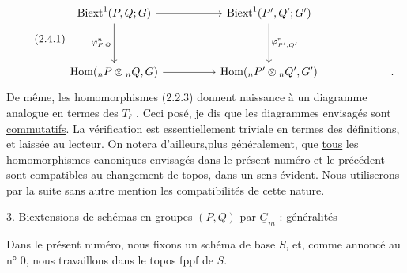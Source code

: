 \begin{equation}\tag{2.4.1}
\begin{tikzcd}[column sep=huge, row sep=huge]
\mathrm{Biext}^1(P,Q;G) \arrow[r] \arrow[d, "{\varphi^n_{P,Q}}"'] & \mathrm{Biext}^1(P',Q';G') \arrow[d, "{\varphi^n_{P',Q'}}"] & \\
\mathrm{Hom}({}_nP \otimes {}_nQ,G) \arrow[r] & \mathrm{Hom}({}_nP' \otimes {}_nQ',G') & \quad .
\end{tikzcd}
\end{equation}
De même, les homomorphismes (2.2.3) donnent naissance à un diagramme analogue en termes des $T_\ell$ . Ceci posé, je dis que les diagrammes envisagés sont \underline{commutatifs}. La vérification est essentiellement triviale en termes des définitions, et laissée au lecteur. On notera d'ailleurs,plus généralement, que \underline{tous} les homomorphismes canoniques envisagés dans le présent numéro et le précédent sont \underline{compatibles} \underline{au changement de topos}, dans un sens évident. Nous utiliserons par la suite sans autre mention les compatibilités de cette nature.




3. \underline{Biextensions de schémas en groupes} $(P,Q)$ \underline{par $\underline{G}_m$} : \underline{généralités}

Dans le présent numéro, nous fixons un schéma de base $S$, et, comme annoncé au n° 0, nous travaillons dans le topos fppf de $S$.

